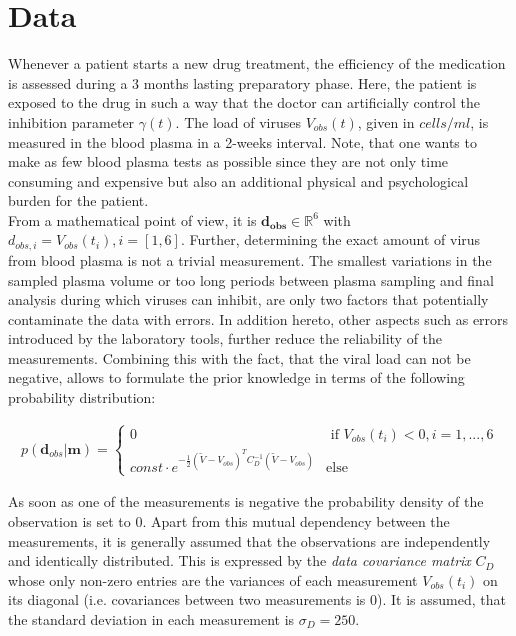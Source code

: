 \section{Data}
\label{sec:Data}

Whenever a patient starts a new drug treatment, the efficiency of the medication is assessed during a 3 months lasting preparatory phase.
Here, the patient is exposed to the drug in such a way that the doctor can artificially control the inhibition parameter $\gamma(t)$.
The load of viruses $V_{obs}(t)$, given in $cells/ml$, is measured in the blood plasma in a 2-weeks interval.
Note, that one wants to make as few blood plasma tests as possible since they are not only time consuming and expensive but also an additional physical and psychological burden for the patient.\\
From a mathematical point of view, it is $\mathbf{d_{obs}} \in \mathbb{R}^6$ with $d_{obs,i} = V_{obs}(t_i), i = [1,6]$.
Further, determining the exact amount of virus from blood plasma is not a trivial measurement.
The smallest variations in the sampled plasma volume or too long periods between plasma sampling and final analysis during which viruses can inhibit, are only two factors that potentially contaminate the data with errors.
In addition hereto, other aspects such as errors introduced by the laboratory tools, further reduce the reliability of the measurements.
Combining this with the fact, that the viral load can not be negative, allows to formulate the prior knowledge in terms of the following probability distribution:

\begin{align*}
p(\mathbf{d}_{obs}|\mathbf{m}) =
    \begin{cases}
        0 & \text{ if $V_{obs}(t_i) < 0, i = 1,...,6$}\\
        const\cdot e^{-\frac{1}{2}(\tilde{V}-V_{obs})^T C_{D}^{-1}(\tilde{V}-V_{obs})} & \text{else}
    \end{cases}
\end{align*}

As soon as one of the measurements is negative the probability density of the observation is set to 0.
Apart from this mutual dependency between the measurements, it is generally assumed that the observations are independently and identically distributed.
This is expressed by the \textit{data covariance matrix} $C_D$ whose only non-zero entries are the variances of each measurement $V_{obs}(t_i)$ on its diagonal (i.e. covariances between two measurements is 0).
It is assumed, that the standard deviation in each measurement is $\sigma_D = 250$.